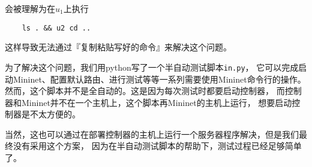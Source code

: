 会被理解为在$u_1$上执行

\begin{lstlisting}
	ls . && u2 cd ..
\end{lstlisting}

这样导致无法通过『复制粘贴写好的命令』来解决这个问题。

为了解决这个问题，我们用python写了一个半自动测试脚本\texttt{in.py}，
它可以完成启动Mininet、配置默认路由、进行测试等等一系列需要使用Mininet命令行的操作。
然而，这个脚本并不是全自动的。这是因为每次测试时都要启动控制器，
而控制器和Mininet并不在一个主机上，这个脚本再Mininet的主机上运行，
想要启动控制器是不太方便的。

当然，这也可以通过在部署控制器的主机上运行一个服务器程序解决，但是我们最终没有采用这个方案，
因为在半自动测试脚本的帮助下，测试过程已经足够简单了。

